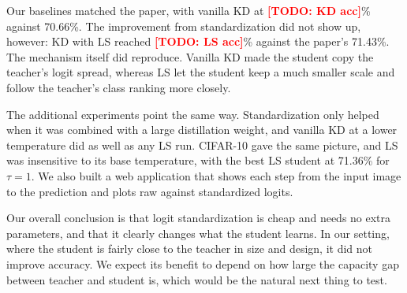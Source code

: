 \documentclass[12pt,a4paper]{article}
\newcommand{\TODO}[1]{\textcolor{red}{\textbf{[TODO: #1]}}}
\newcommand{\KDacc}{\TODO{KD acc}}
\newcommand{\LSacc}{\TODO{LS acc}}
\begin{document}
Our baselines matched the paper, with vanilla KD at \KDacc\% against 70.66\%. The improvement from standardization did not show up, however: KD with LS reached \LSacc\% against the paper's 71.43\%. The mechanism itself did reproduce. Vanilla KD made the student copy the teacher's logit spread, whereas LS let the student keep a much smaller scale and follow the teacher's class ranking more closely.

The additional experiments point the same way. Standardization only helped when it was combined with a large distillation weight, and vanilla KD at a lower temperature did as well as any LS run. CIFAR-10 gave the same picture, and LS was insensitive to its base temperature, with the best LS student at 71.36\% for $\tau=1$. We also built a web application that shows each step from the input image to the prediction and plots raw against standardized logits.

Our overall conclusion is that logit standardization is cheap and needs no extra parameters, and that it clearly changes what the student learns. In our setting, where the student is fairly close to the teacher in size and design, it did not improve accuracy. We expect its benefit to depend on how large the capacity gap between teacher and student is, which would be the natural next thing to test.
\end{document}
